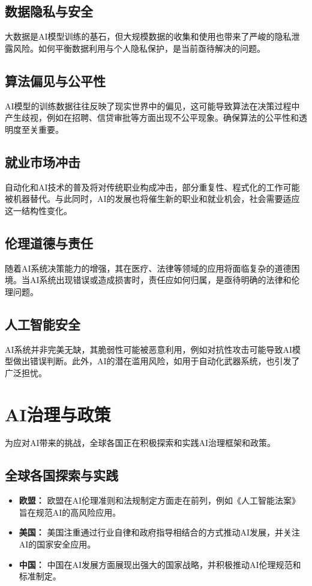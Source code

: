 \subsection{数据隐私与安全}
大数据是AI模型训练的基石，但大规模数据的收集和使用也带来了严峻的隐私泄露风险。如何平衡数据利用与个人隐私保护，是当前亟待解决的问题。

\subsection{算法偏见与公平性}
AI模型的训练数据往往反映了现实世界中的偏见，这可能导致算法在决策过程中产生歧视，例如在招聘、信贷审批等方面出现不公平现象。确保算法的公平性和透明度至关重要。

\subsection{就业市场冲击}
自动化和AI技术的普及将对传统职业构成冲击，部分重复性、程式化的工作可能被机器替代。与此同时，AI的发展也将催生新的职业和就业机会，社会需要适应这一结构性变化。

\subsection{伦理道德与责任}
随着AI系统决策能力的增强，其在医疗、法律等领域的应用将面临复杂的道德困境。当AI系统出现错误或造成损害时，责任应如何归属，是亟待明确的法律和伦理问题。

\subsection{人工智能安全}
AI系统并非完美无缺，其脆弱性可能被恶意利用，例如对抗性攻击可能导致AI模型做出错误判断。此外，AI的潜在滥用风险，如用于自动化武器系统，也引发了广泛担忧。

\section{AI治理与政策}

为应对AI带来的挑战，全球各国正在积极探索和实践AI治理框架和政策。

\subsection{全球各国探索与实践}
\begin{itemize}
    \item \textbf{欧盟：} 欧盟在AI伦理准则和法规制定方面走在前列，例如《人工智能法案》旨在规范AI的高风险应用。
    \item \textbf{美国：} 美国注重通过行业自律和政府指导相结合的方式推动AI发展，并关注AI的国家安全应用。
    \item \textbf{中国：} 中国在AI发展方面展现出强大的国家战略，并积极推动AI伦理规范和标准制定。
\end{itemize}

